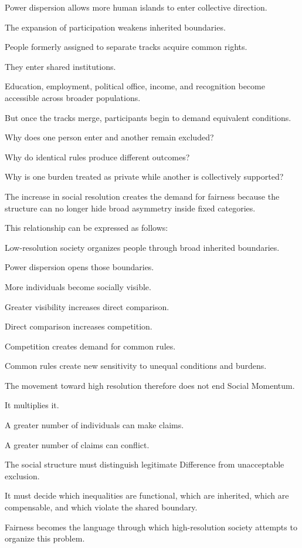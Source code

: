 Power dispersion allows more human islands to enter collective direction.

The expansion of participation weakens inherited boundaries.

People formerly assigned to separate tracks acquire common rights.

They enter shared institutions.

Education, employment, political office, income, and recognition become accessible across broader populations.

But once the tracks merge, participants begin to demand equivalent conditions.

Why does one person enter and another remain excluded?

Why do identical rules produce different outcomes?

Why is one burden treated as private while another is collectively supported?

The increase in social resolution creates the demand for fairness because the structure can no longer hide broad asymmetry inside fixed categories.

This relationship can be expressed as follows:

Low-resolution society organizes people through broad inherited boundaries.

Power dispersion opens those boundaries.

More individuals become socially visible.

Greater visibility increases direct comparison.

Direct comparison increases competition.

Competition creates demand for common rules.

Common rules create new sensitivity to unequal conditions and burdens.

The movement toward high resolution therefore does not end Social Momentum.

It multiplies it.

A greater number of individuals can make claims.

A greater number of claims can conflict.

The social structure must distinguish legitimate Difference from unacceptable exclusion.

It must decide which inequalities are functional, which are inherited, which are compensable, and which violate the shared boundary.

Fairness becomes the language through which high-resolution society attempts to organize this problem.

